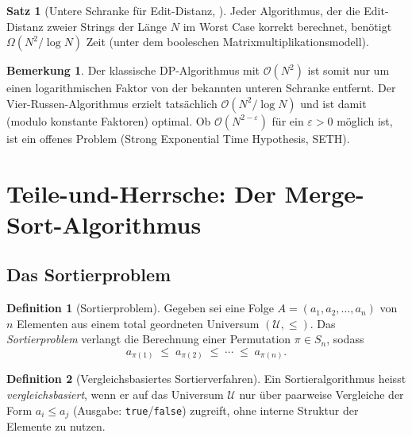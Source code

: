 ﻿\documentclass[a4paper,12pt]{article}
\theoremstyle{definition}
\newtheorem{definition}{Definition}
\newtheorem{satz}{Satz}
\newtheorem{bemerkung}{Bemerkung}
\begin{document}
\begin{satz}[Untere Schranke für Edit-Distanz, \cite{masek1980}]
    Jeder Algorithmus, der die Edit-Distanz zweier Strings der Länge $N$ im
    Worst Case korrekt berechnet, benötigt $\Omega(N^2 / \log N)$ Zeit
    (unter dem booleschen Matrixmultiplikationsmodell).
\end{satz}

\begin{bemerkung}
    Der klassische DP-Algorithmus mit $\mathcal{O}(N^2)$ ist somit nur um einen
    logarithmischen Faktor von der bekannten unteren Schranke entfernt. Der
    Vier-Russen-Algorithmus \cite{masek1980} erzielt tatsächlich
    $\mathcal{O}(N^2 / \log N)$ und ist damit (modulo konstante Faktoren) optimal.
    Ob $\mathcal{O}(N^{2-\varepsilon})$ für ein $\varepsilon > 0$ möglich ist,
    ist ein offenes Problem (Strong Exponential Time Hypothesis, SETH).
\end{bemerkung}

\section{Teile-und-Herrsche: Der Merge-Sort-Algorithmus}

\subsection{Das Sortierproblem}

\begin{definition}[Sortierproblem]
    Gegeben sei eine Folge $A = (a_1, a_2, \ldots, a_n)$ von $n$ Elementen aus
    einem total geordneten Universum $(\mathcal{U}, \leq)$. Das
    \emph{Sortierproblem} verlangt die Berechnung einer Permutation
    $\pi \in S_n$, sodass
    \[
        a_{\pi(1)} \;\leq\; a_{\pi(2)} \;\leq\; \cdots \;\leq\; a_{\pi(n)}.
    \]
\end{definition}

\begin{definition}[Vergleichsbasiertes Sortierverfahren]
    Ein Sortieralgorithmus heisst \emph{vergleichsbasiert}, wenn er auf das
    Universum $\mathcal{U}$ nur über paarweise Vergleiche der Form $a_i \leq a_j$
    (Ausgabe: \texttt{true}/\texttt{false}) zugreift, ohne interne Struktur
    der Elemente zu nutzen.
\end{definition}
\end{document}
